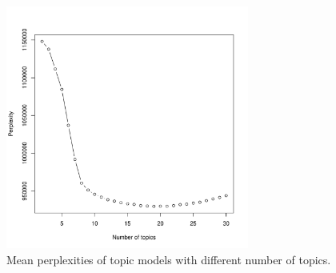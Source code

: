 \begin{figure}[h]
\centering
    \includegraphics[width=8cm]{fig/perp_mean_plot30.pdf}
    \caption{Mean perplexities of topic models with different number of topics.}
    \label{fig:prep_plot}
\end{figure}


